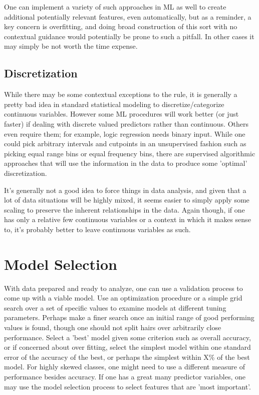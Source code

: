 \documentclass[english,nohyper,titlepage]{tufte-handout}\usepackage{knitr}
\begin{document}
One can implement a variety of such approaches in ML as well to create additional potentially relevant features, even automatically, but as a reminder, a key concern is overfitting, and doing broad construction of this sort with no contextual guidance would potentially be prone to such a pitfall.  In other cases it may simply be not worth the time expense.

\subsection{Discretization}
While there may be some contextual exceptions to the rule, it is generally a pretty bad idea in standard statistical modeling to discretize/categorize continuous variables.  However some ML procedures will work better (or just faster) if dealing with discrete valued predictors rather than continuous. Others even require them; for example, logic regression needs binary input.  While one could pick arbitrary intervals and cutpoints in an unsupervised fashion such as picking equal range bins or equal frequency bins, there are supervised algorithmic approaches that will use the information in the data to produce some 'optimal' discretization.

It's generally not a good idea to force things in data analysis, and given that a lot of data situations will be highly mixed, it seems easier to simply apply some scaling to preserve the inherent relationships in the data.  Again though, if one has only a relative few continuous variables or a context in which it makes sense to, it's probably better to leave continuous variables as such.

\section{Model Selection}
With data prepared and ready to analyze, one can use a validation process to come up with a viable model.  Use an optimization procedure or a simple grid search over a set of specific values to examine models at different tuning parameters. Perhaps make a finer search once an initial range of good performing values is found, though one should not split hairs over arbitrarily close performance.  Select a 'best' model given some criterion such as overall accuracy, or if concerned about over fitting, select the simplest model within one standard error of the accuracy of the best, or perhaps the simplest within X\% of the best model.  For highly skewed classes, one might need to use a different measure of performance besides accuracy.  If one has a great many predictor variables, one may use the model selection process to select features that are 'most important'.
\end{document}
